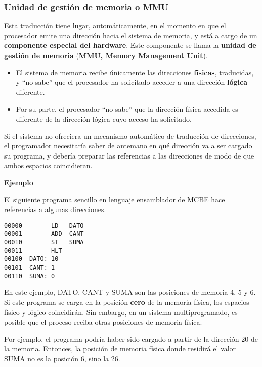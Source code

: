 \documentclass[spanish,A4,]{article}
\begin{document}
\subsubsection{Unidad de gestión de memoria o
MMU}\label{unidad-de-gestiuxf3n-de-memoria-o-mmu}

Esta traducción tiene lugar, automáticamente, en el momento en que el
procesador emite una dirección hacia el sistema de memoria, y está a
cargo de un \textbf{componente especial del hardware}. Este componente
se llama la \textbf{unidad de gestión de memoria} (\textbf{MMU, Memory
Management Unit}).

\begin{itemize}
\itemsep1pt\parskip0pt
\item
  El sistema de memoria recibe únicamente las direcciones
  \textbf{físicas}, traducidas, y ``no sabe'' que el procesador ha
  solicitado acceder a una dirección \textbf{lógica} diferente.
\item
  Por su parte, el procesador ``no sabe'' que la dirección física
  accedida es diferente de la dirección lógica cuyo acceso ha
  solicitado.
\end{itemize}

Si el sistema no ofreciera un mecanismo automático de traducción de
direcciones, el programador necesitaría saber de antemano en qué
dirección va a ser cargado su programa, y debería preparar las
referencias a las direcciones de modo de que ambos espacios
coincidieran.

\textbf{Ejemplo}

El siguiente programa sencillo en lenguaje ensamblador de MCBE hace
referencias a algunas direcciones.

\begin{verbatim}
00000        LD   DATO
00001        ADD  CANT
00010        ST   SUMA
00011        HLT
00100  DATO: 10
00101  CANT: 1
00110  SUMA: 0
\end{verbatim}

En este ejemplo, DATO, CANT y SUMA son las posiciones de memoria 4, 5 y
6. Si este programa se carga en la posición \textbf{cero} de la memoria
física, los espacios físico y lógico coincidirán. Sin embargo, en un
sistema multiprogramado, es posible que el proceso reciba otras
posiciones de memoria física.

Por ejemplo, el programa podría haber sido cargado a partir de la
dirección 20 de la memoria. Entonces, la posición de memoria física
donde residirá el valor SUMA no es la posición 6, sino la 26.
\end{document}

